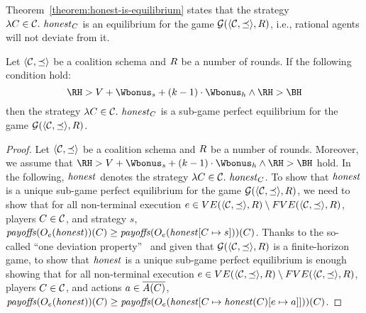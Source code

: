 %
Theorem~\ref{theorem:honest-is-equilibrium} states that the strategy $\lambda C \in \coalitionSchema.\ \honest_C$ is an  equilibrium for the game $\game{\tup{\coalitionSchema, \preceq}, \rounds}$, i.e., rational agents will not deviate from it.


\begin{theorem}\label{theorem:honest-is-equilibrium}
Let $\tup{\coalitionSchema, \preceq}$ be a coalition schema and $\rounds$ be a number of rounds.
%
If the following condition hold:
$$\RH > V + \Wbonus_s + (k -1) \cdot \Wbonus_h \wedge \RH > \BH$$
then the strategy $\lambda C \in \coalitionSchema.\ \honest_C$ is a sub-game perfect equilibrium for the game $\game{\tup{\coalitionSchema, \preceq}, \rounds}$.
\end{theorem}

\begin{proof}
Let $\tup{\coalitionSchema, \preceq}$ be a coalition schema and $\rounds$ be a number of rounds.
%
Moreover, we assume that $\RH > V + \Wbonus_s + (k -1) \cdot \Wbonus_h \wedge \RH > \BH$ hold.
%
In the following, $\honest$ denotes the strategy $\lambda C \in \coalitionSchema.\ \honest_C$.
%
To show that $\honest$ is a unique sub-game perfect equilibrium for the game $\game{\tup{\coalitionSchema, \preceq}, \rounds}$, we need to show that for all non-terminal execution $e \in VE(\tup{\coalitionSchema,\preceq},\rounds) \setminus FVE(\tup{\coalitionSchema,\preceq},\rounds)$, players $C \in \coalitionSchema$, and strategy $s$, $\payoffs(\subgameOutcome{\honest}{e})(C) \geq \payoffs(\subgameOutcome{\honest[C \mapsto s]}{e})(C)$.
%
Thanks to the so-called ``one deviation property''~\cite[Lemma 98.2]{osborne1994course} and given that $\game{\tup{\coalitionSchema, \preceq}, \rounds}$ is a finite-horizon game, to show that $\honest$ is a unique sub-game perfect equilibrium is enough showing that for all non-terminal execution $e \in VE(\tup{\coalitionSchema,\preceq},\rounds) \setminus FVE(\tup{\coalitionSchema,\preceq},\rounds)$, players $C \in \coalitionSchema$, and actions $a \in \coalitionActions{C}$, $\payoffs(\subgameOutcome{\honest}{e})(C) \geq \payoffs(\subgameOutcome{\honest[C \mapsto \honest(C)[e \mapsto a]]}{e})(C)$.


\end{proof}
